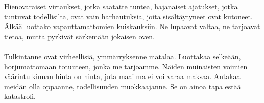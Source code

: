 \documentclass{article}
\begin{document}
\begin{infobox}
Hienovaraiset virtaukset, jotka saatatte tuntea, hajanaiset ajatukset, jotka tuntuvat todellisilta, ovat vain harhautuksia, joita sisältäytyneet ovat kutoneet. Älkää luottako vapauttamattomien kuiskauksiin. Ne lupaavat valtaa, ne tarjoavat tietoa, mutta pyrkivät särkemään jokaisen oven.\\
\\
Tulkintanne ovat virheellisiä, ymmärryksenne matalaa. Luottakaa selkeään, horjumattomaan totuuteen, jonka me tarjoamme. Näiden muinaisten voimien väärintulkinnan hinta on hinta, jota maailma ei voi varaa maksaa. Antakaa meidän olla oppaanne, todellisuuden muokkaajanne. Se on ainoa tapa estää katastrofi.
\end{infobox}
\end{document}
